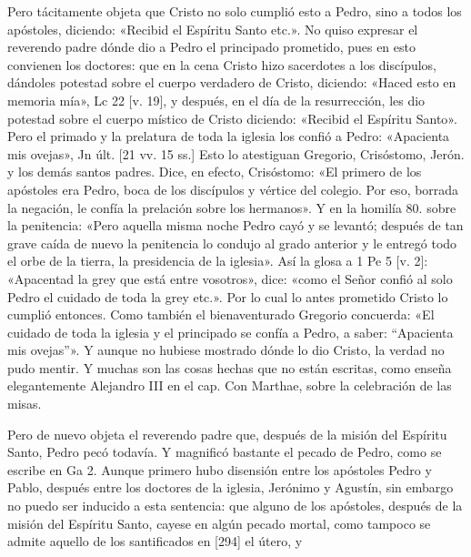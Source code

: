 Pero tácitamente objeta que Cristo no solo cumplió esto a Pedro, sino a todos los apóstoles, diciendo: «Recibid el Espíritu Santo etc.». No quiso expresar el reverendo padre dónde dio a Pedro el principado prometido, pues en esto convienen los doctores: que en la cena Cristo hizo sacerdotes a los discípulos, dándoles potestad sobre el cuerpo verdadero de Cristo, diciendo: «Haced esto en memoria mía», Lc 22 [v. 19], y después, en el día de la resurrección, les dio potestad sobre el cuerpo místico de Cristo diciendo: «Recibid el Espíritu Santo». Pero el primado y la prelatura de toda la iglesia los confió a Pedro: «Apacienta mis ovejas», Jn últ. [21 vv. 15 ss.] Esto lo atestiguan Gregorio, Crisóstomo, Jerón. y los demás santos padres. Dice, en efecto, Crisóstomo: «El primero de los apóstoles era Pedro, boca de los discípulos y vértice del colegio. Por eso, borrada la negación, le confía la prelación sobre los hermanos». Y en la homilía 80. sobre la penitencia: «Pero aquella misma noche Pedro cayó y se levantó; después de tan grave caída de nuevo la penitencia lo condujo al grado anterior y le entregó todo el orbe de la tierra, la presidencia de la iglesia». Así la glosa a 1 Pe 5 [v. 2]: «Apacentad la grey que está entre vosotros», dice: «como el Señor confió al solo Pedro el cuidado de toda la grey etc.». Por lo cual lo antes prometido Cristo lo cumplió entonces. Como también el bienaventurado Gregorio concuerda: «El cuidado de toda la iglesia y el principado se confía a Pedro, a saber: “Apacienta mis ovejas”». Y aunque no hubiese mostrado dónde lo dio Cristo, la verdad no pudo mentir. Y muchas son las cosas hechas que no están escritas, como enseña elegantemente Alejandro III en el cap. Con Marthae, sobre la celebración de las misas.

Pero de nuevo objeta el reverendo padre que, después de la misión del Espíritu Santo, Pedro pecó todavía. Y magnificó bastante el pecado de Pedro, como se escribe en Ga 2. Aunque primero hubo disensión entre los apóstoles Pedro y Pablo, después entre los doctores de la iglesia, Jerónimo y Agustín, sin embargo no puedo ser inducido a esta sentencia: que alguno de los apóstoles, después de la misión del Espíritu Santo, cayese en algún pecado mortal, como tampoco se admite aquello de los santificados en [294] el útero, y

